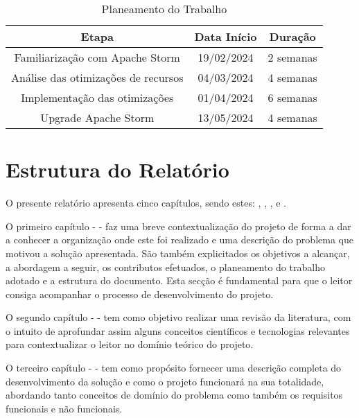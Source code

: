 \begin{table}[H]
  \begin{center}
    \caption{Planeamento do Trabalho}
    \vspace{5mm}
    \label{tab:plan}
    \begin{tabular}{|c|c|c|}
      \hline
      \textbf{Etapa} & \textbf{Data Início} & \textbf{Duração} \\ \hline
      Familiarização com Apache Storm  & 19/02/2024 & 2 semanas \\ \hline
      Análise das otimizações de recursos & 04/03/2024 & 4 semanas \\ \hline
      Implementação das otimizações & 01/04/2024 & 6 semanas \\ \hline
      Upgrade Apache Storm & 13/05/2024 & 4 semanas \\ \hline
    \end{tabular}
  \end{center}
\end{table}

\section{Estrutura do Relatório}

O presente relatório apresenta cinco capítulos, sendo estes: ,
, ,  e
.

O primeiro capítulo -  - faz uma breve contextualização do projeto de
forma a dar a conhecer a organização onde este foi realizado e uma descrição do problema que motivou
a solução apresentada. São também explicitados os objetivos a alcançar, a abordagem a seguir, os
contributos efetuados, o planeamento do trabalho adotado e a estrutura do documento. Esta secção é 
fundamental para que o leitor consiga acompanhar o processo de desenvolvimento do projeto.

O segundo capítulo -  - tem como objetivo realizar uma revisão da
literatura, com o intuito de aprofundar assim alguns conceitos científicos e tecnologias relevantes 
para contextualizar o leitor no domínio teórico do projeto.  

O terceiro capítulo -  - tem como propósito fornecer uma descrição completa 
do desenvolvimento da solução e como o projeto funcionará na sua totalidade, abordando tanto conceitos
de domínio do problema como também os requisitos funcionais e não funcionais.

